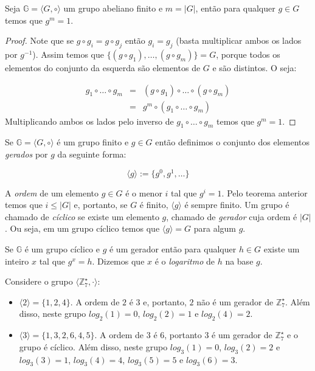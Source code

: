 \begin{theorem}
\label{theo:gen-euler}
  Seja $\mathbb{G} = \langle G, \circ \rangle$ um grupo abeliano finito e $m = |G|$, então para qualquer $g \in G$ temos que $g^m = 1$.
\end{theorem}
\begin{proof}
  Note que se $g \circ g_i = g \circ g_j$ então $g_i = g_j$ (basta multiplicar ambos os lados por $g^{-1}$).
  Assim temos que $\{(g \circ g_1), \dots, (g \circ g_m)\} = G$, porque todos os elementos do conjunto da esquerda são elementos de $G$ e são distintos.
  O seja:

  \begin{eqnarray*}
    g_1 \circ \dots \circ g_m & = & (g \circ g_1) \circ \dots \circ (g \circ g_m)\\
                              & = & g^m \circ (g_1 \circ \dots \circ g_m)
  \end{eqnarray*}
  Multiplicando ambos os lados pelo inverso de $g_1 \circ \dots \circ g_m$ temos que $g^m = 1$.
\end{proof}

Se $\mathbb{G} = \langle G, \circ \rangle$ é um grupo finito e $g \in G$ então definimos o conjunto dos elementos {\em gerados} por $g$ da seguinte forma:

\begin{displaymath}
  \langle g \rangle := \{g^0, g^1, \dots \}
\end{displaymath}

A {\em ordem} de um elemento $g \in G$ é o menor $i$ tal que $g^i = 1$.
Pelo teorema anterior temos que $i \leq |G|$ e, portanto, se $G$ é finito, $\langle g \rangle$ é sempre finito.
Um grupo é chamado de {\em cíclico} se existe um elemento $g$, chamado de {\em gerador} cuja ordem é $|G|$.
Ou seja, em um grupo cíclico temos que $\langle g \rangle = G$ para algum $g$.

Se $\mathbb{G}$ é um grupo cíclico e $g$ é um gerador então para qualquer $h \in G$ existe um inteiro $x$ tal que $g^x = h$.
Dizemos que $x$ é o {\em logaritmo} de $h$ na base $g$.


\begin{example}
Considere o grupo $\langle \mathbb{Z}_7^\star, \cdot \rangle$:
\begin{itemize}
\item $\langle 2 \rangle = \{1, 2, 4\}$. A ordem de $2$ é $3$ e, portanto, $2$ não é um gerador de $\mathbb{Z}_7^\star$.
Além disso, neste grupo $log_2(1) = 0$, $log_2(2) = 1$ e $log_2(4) = 2$.
\item $\langle 3 \rangle = \{1, 3, 2, 6, 4, 5\}$. A ordem de $3$ é $6$, portanto $3$ é um gerador de $\mathbb{Z}_7^\star$ e o grupo é cíclico.
Além disso, neste grupo $log_3(1) = 0$, $log_3(2) = 2$ e $log_3(3) = 1$, $log_3(4)= 4$, $log_3(5) = 5$ e $log_3(6) = 3$.
\end{itemize}
\end{example}


